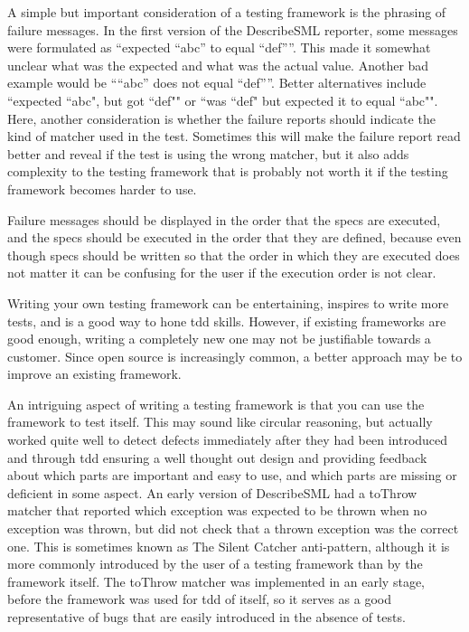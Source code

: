 \documentclass[11pt]{article}
\begin{document}
A simple but important consideration of a testing framework is the phrasing of failure messages. In the first version of the DescribeSML reporter, some messages were formulated as ``expected ``abc'' to equal ``def''''. This made it somewhat unclear what was the expected and what was the actual value. Another bad example would be ````abc'' does not equal ``def''''. Better alternatives include ``expected ``abc", but got ``def"" or ``was ``def" but expected it to equal ``abc"". Here, another consideration is whether the failure reports should indicate the kind of \gls{matcher} used in the test. Sometimes this will make the failure report read better and reveal if the test is using the wrong \gls{matcher}, but it also adds complexity to the testing framework that is probably not worth it if the testing framework becomes harder to use.

Failure messages should be displayed in the order that the \glspl{spec} are executed, and the \glspl{spec} should be executed in the order that they are defined, because even though \glspl{spec} should be written so that the order in which they are executed does not matter it can be confusing for the user if the execution order is not clear.

Writing your own testing framework can be entertaining, inspires to write more tests, and is a good way to hone \gls{tdd} skills. However, if existing frameworks are good enough, writing a completely new one may not be justifiable towards a customer. Since open source is increasingly common, a better approach may be to improve an existing framework.

An intriguing aspect of writing a testing framework is that you can use the framework to test itself. This may sound like circular reasoning, but actually worked quite well to detect defects immediately after they had been introduced and through \gls{tdd} ensuring a well thought out design and providing feedback about which parts are important and easy to use, and which parts are missing or deficient in some aspect. An early version of DescribeSML had a toThrow matcher that reported which exception was expected to be thrown when no exception was thrown, but did not check that a thrown exception was the correct one. This is sometimes known as The Silent Catcher anti-pattern, although it is more commonly introduced by the user of a testing framework than by the framework itself. The toThrow matcher was implemented in an early stage, before the framework was used for \gls{tdd} of itself, so it serves as a good representative of bugs that are easily introduced in the absence of tests.
\end{document}

